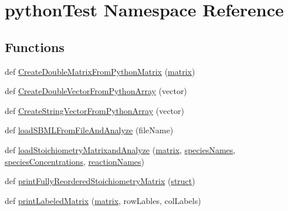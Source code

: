 \hypertarget{namespacepython_test}{}\section{python\+Test Namespace Reference}
\label{namespacepython_test}
\subsection*{Functions}
\begin{DoxyCompactItemize}
\item 
def \hyperlink{namespacepython_test_ae083050f937070378e6de4f5a3e20526}{Create\+Double\+Matrix\+From\+Python\+Matrix} (\hyperlink{namespacepython_test_a729fc15cc8ffbf8745dd4b7476e8324a}{matrix})
\item 
def \hyperlink{namespacepython_test_a10f69eede98349a1899063520eb59eb7}{Create\+Double\+Vector\+From\+Python\+Array} (vector)
\item 
def \hyperlink{namespacepython_test_ab9da529648677b978d716d44136c5f0f}{Create\+String\+Vector\+From\+Python\+Array} (vector)
\item 
def \hyperlink{namespacepython_test_a11223e63fc625facc0b202d6001628a1}{load\+S\+B\+M\+L\+From\+File\+And\+Analyze} (file\+Name)
\item 
def \hyperlink{namespacepython_test_ac7fd6c671900e7bc662290121c907b18}{load\+Stoichiometry\+Matrixand\+Analyze} (\hyperlink{namespacepython_test_a729fc15cc8ffbf8745dd4b7476e8324a}{matrix}, \hyperlink{namespacepython_test_a0a8e8643e0a24523d16aa025aa13df5c}{species\+Names}, \hyperlink{namespacepython_test_ad7229d8301e65692ae21c96d99b3a43f}{species\+Concentrations}, \hyperlink{namespacepython_test_a004f052ba812c8e03bbab159cd7d3b75}{reaction\+Names})
\item 
def \hyperlink{namespacepython_test_ad1c52a7e80b94b89987c43cf46c972bc}{print\+Fully\+Reordered\+Stoichiometry\+Matrix} (\hyperlink{namespacepython_test_ac673393a25db52d0a3bdc27bbbd13135}{struct})
\item 
def \hyperlink{namespacepython_test_a73da44c65a4eed87a4d1c17688e1f556}{print\+Labeled\+Matrix} (\hyperlink{namespacepython_test_a729fc15cc8ffbf8745dd4b7476e8324a}{matrix}, row\+Lables, col\+Labels)
\end{DoxyCompactItemize}

